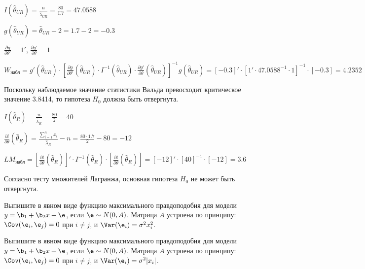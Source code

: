 \documentclass[pdftex,11pt,openany]{book}\usepackage[]{graphicx}\usepackage[]{color}
\begin{document}
\begin{solution}
$I(\hat{\theta}_{UR}) = \frac{n}{\hat{\lambda}_{UR}} = \frac{80}{1.7} = 47.0588$

$g(\hat{\theta}_{UR}) = \hat{\theta}_{UR} - 2 = 1.7 - 2 = -0.3$

$\frac{\partial g}{\partial \theta'} = 1'$, $\frac{\partial g'}{\partial \theta} = 1$

$W_{\text{набл}} = g'(\hat{\theta}_{UR}) \cdot \left[ \frac{\partial g}{\partial \theta'}(\hat{\theta}_{UR}) \cdot I^{-1}(\hat{\theta}_{UR}) \cdot \frac{\partial g'}{\partial \theta}(\hat{\theta}_{UR}) \right]^{-1} g(\hat{\theta}_{UR}) = [-0.3]' \cdot [1' \cdot 47.0588^{-1} \cdot 1]^{-1} \cdot [-0.3] = 4.2352$

Поскольку наблюдаемое значение статистики Вальда превосходит критическое значение 3.8414, то гипотеза $H_0$ должна быть отвергнута.

$I(\hat{\theta}_{R}) = \frac{n}{\hat{\lambda}_{R}} = \frac{80}{2} = 40$

$\frac{\partial l}{\partial \theta}(\hat{\theta}_R) = \frac{\sum_{i=1}^n x_i}{\hat{\lambda}_R} - n = \frac{80 \cdot 1.7}{2} - 80 = -12$

$LM_{\text{набл}} = \left[ \frac{\partial l}{\partial \theta}(\hat{\theta}_{R}) \right]' \cdot I^{-1}(\hat{\theta}_{R}) \cdot \left[ \frac{\partial l}{\partial \theta}(\hat{\theta}_{R}) \right] = [-12]' \cdot [40]^{-1} \cdot [-12] = 3.6$

Согласно тесту множителей Лагранжа, основная гипотеза $H_0$ не может быть отвергнута.
\end{solution}



\begin{problem}
Выпишите в явном виде функцию максимального правдоподобия для модели $y=\b_1+\b_2 x+\e$, если $\e\sim N(0,A)$. 
Матрица $A$ устроена по принципу: $\Cov(\e_i,\e_j)=0$ при $i\neq j$, и $\Var(\e_i)=\sigma^2 x_i^2$.
\end{problem}

\begin{solution}
\end{solution}

\begin{problem}
Выпишите в явном виде функцию максимального правдоподобия для модели $y=\b_1+\b_2 x+\e$, если $\e\sim N(0,A)$. 
Матрица $A$ устроена по принципу: $\Cov(\e_i,\e_j)=0$ при $i\neq j$, и $\Var(\e_i)=\sigma^2 |x_i|$.
\end{problem}

\begin{solution}
\end{solution}
\end{document}
